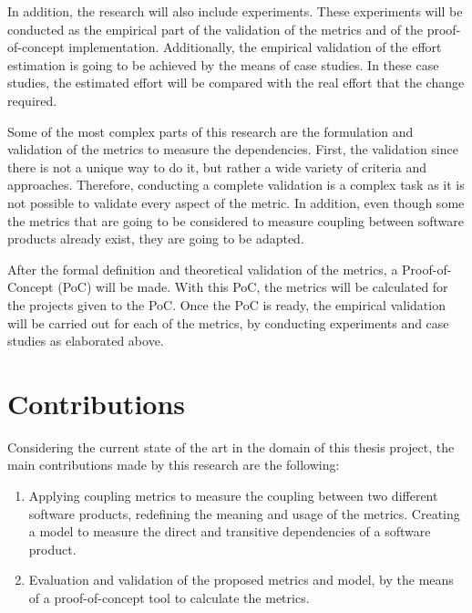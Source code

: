 \blankl
In addition, the research will also include experiments. These experiments will be conducted as the empirical part of the validation of the metrics and of the proof-of-concept implementation. Additionally, the empirical validation of the effort estimation is going to be achieved by the means of case studies. In these case studies, the estimated effort will be compared with the real effort that the change required. 

\blankl
Some of the most complex parts of this research are the formulation and validation of the metrics to measure the dependencies.
First, the validation since there is not a unique way to do it, but rather a wide variety of criteria and approaches. Therefore, conducting a complete validation is a complex task as it is not possible to validate every aspect of the metric.
In addition, even though some the metrics that are going to be considered to measure coupling between software products already exist, they are going to be adapted.

\blankl
After the formal definition and theoretical validation of the metrics, a Proof-of-Concept (PoC) will be made. With this PoC, the metrics will be calculated for the projects given to the PoC. Once the PoC is ready, the empirical validation will be carried out for each of the metrics, by conducting experiments and case studies as elaborated above.

\section{Contributions} %
Considering the current state of the art in the domain of this thesis project, the main contributions made by this research are the following:

\begin{enumerate}
	\item Applying coupling metrics to measure the coupling between two different software products, redefining the meaning and usage of the metrics. Creating a model to measure the direct and transitive dependencies of a software product.
  \blankls

	\item Evaluation and validation of the proposed metrics and model, by the means of a proof-of-concept tool to calculate the metrics.
\end{enumerate}

